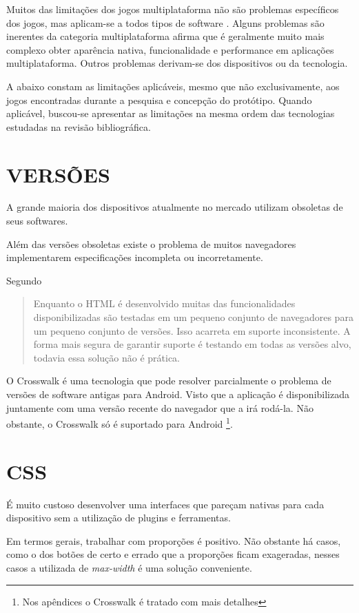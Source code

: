 
Muitos das limitações dos jogos multiplataforma não são
problemas específicos dos jogos, mas aplicam-se a todos tipos
de software \parencite{currentStateCrossPlatform}. Alguns
problemas são inerentes da categoria multiplataforma \cite[pp.
7 ]{viabilityBusinessApplications} afirma que é geralmente muito
mais complexo obter aparência nativa, funcionalidade e performance
em aplicações multiplataforma. Outros problemas derivam-se dos
dispositivos ou da tecnologia.

A abaixo constam as limitações aplicáveis, mesmo que não
exclusivamente, aos jogos encontradas durante a pesquisa e concepção
do protótipo. Quando aplicável, buscou-se apresentar as limitações
na mesma ordem das tecnologias estudadas na revisão bibliográfica.

\section{VERSÕES}

A grande maioria dos dispositivos atualmente no mercado utilizam
obsoletas de seus softwares.

Além das versões obsoletas existe o problema de muitos navegadores 
implementarem especificações incompleta ou incorretamente.

Segundo \cite{crossPlatformMobileGame}
\begin{quote}
Enquanto o HTML é desenvolvido muitas das funcionalidades
disponibilizadas são testadas em um pequeno conjunto de navegadores
para um pequeno conjunto de versões. Isso acarreta em suporte
inconsistente. A forma mais segura de garantir suporte é testando em
todas as versões alvo, todavia essa solução não é prática.
\end{quote}

O Crosswalk é uma tecnologia que pode resolver parcialmente o problema
de versões de software antigas para Android. Visto que a aplicação
é disponibilizada juntamente com uma versão recente do navegador que
a irá rodá-la. Não obstante, o Crosswalk só é suportado
para Android \footnote{Nos apêndices o Crosswalk é tratado com mais
detalhes}.

\section{CSS}

É muito custoso desenvolver uma interfaces que pareçam nativas
para cada dispositivo sem a utilização de plugins e ferramentas.

Em termos gerais, trabalhar com proporções é positivo. Não obstante
há casos, como o dos botões de certo e errado que a proporções ficam
exageradas, nesses casos a utilizada de \textit{max-width} é uma solução
conveniente.

